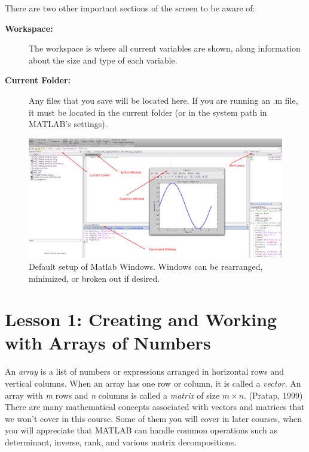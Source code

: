 \documentclass[paper=a4, fontsize=11pt]{scrartcl} %
\numberwithin{equation}{section} %
\numberwithin{figure}{section} %
\numberwithin{table}{section} %
\begin{document}
There are two other important sections of the screen to be aware of:
\begin{description}
\item[\textbf{Workspace:}] The workspace is where all current variables are shown, along information about the size and type of each variable. 

\item[\textbf{Current Folder:}] Any files that you save will be located here. If you are running an .m file, it must be located in the current folder (or in the system path in MATLAB's settings).
\end{description}

\begin{figure}[h!]
\centering
\includegraphics[scale=.25]{matlab_screenshot}
\caption{Default setup of Matlab Windows. Windows can be rearranged, minimized, or broken out if desired.}
\end{figure}

\section{Lesson 1: Creating and Working with Arrays of Numbers}

An \textit{array} is a list of numbers or expressions arranged in horizontal rows and vertical columns.
When an array has one row or column, it is called a \textit{vector.}
An array with \textit{m} rows and \textit{n} columns is called a \textit{matrix} of size $m \times n$. (Pratap, 1999) \\

There are many mathematical concepts associated with vectors and matrices that we won't cover in this course. 
Some of them you will cover in later courses, when you will appreciate that MATLAB can handle common operations such as determinant, inverse, rank, and various matrix decompositions.\\
\end{document}

